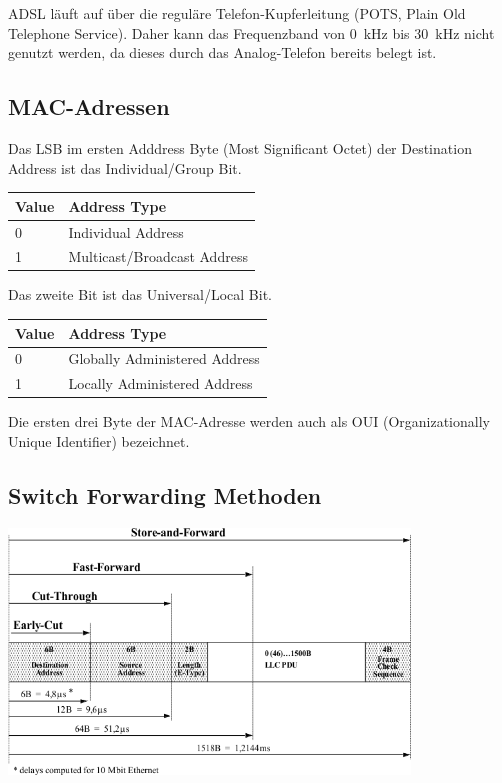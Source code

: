 ADSL läuft auf über die reguläre Telefon-Kupferleitung (POTS, Plain Old
Telephone Service). Daher kann das Frequenzband von 0~kHz bis 30~kHz nicht
genutzt werden, da dieses durch das Analog-Telefon bereits belegt ist.


\subsection{MAC-Adressen}

Das LSB im ersten Adddress Byte (Most Significant Octet) der Destination Address
ist das Individual/Group Bit.

\begin{tabular}[h]{|l|l|}
	\hline
  \textbf{Value} & \textbf{Address Type} \\
	\hline
  0 & Individual Address \\
  1 & Multicast/Broadcast Address \\
	\hline
\end{tabular}

Das zweite Bit ist das Universal/Local Bit.

\begin{tabular}[h]{|l|l|}
	\hline
  \textbf{Value} & \textbf{Address Type} \\
	\hline
  0 & Globally Administered Address \\
  1 & Locally Administered Address \\
	\hline
\end{tabular}

Die ersten drei Byte der MAC-Adresse werden auch als OUI (Organizationally
Unique Identifier) bezeichnet.


\subsection{Switch Forwarding Methoden}

\begin{center}
	\includegraphics[width=0.8\textwidth]{media/switch_forwarding.png}
\end{center}

